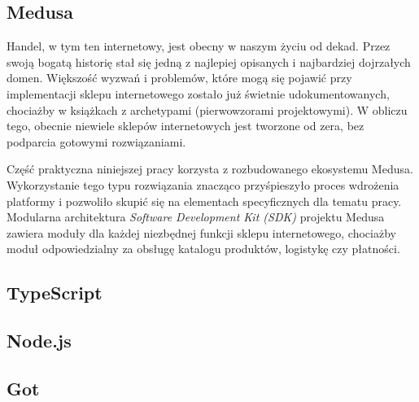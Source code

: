 %

%
%
%

\subsection{Medusa}\label{subsec:medusa}

Handel, w tym ten internetowy, jest obecny w naszym życiu od dekad.
Przez swoją bogatą historię stał się jedną z najlepiej opisanych i najbardziej dojrzałych domen.
Większość wyzwań i problemów, które mogą się pojawić przy implementacji sklepu internetowego zostało już świetnie udokumentowanych, chociażby w książkach z archetypami (pierwowzorami projektowymi).
W obliczu tego, obecnie niewiele sklepów internetowych jest tworzone od zera, bez podparcia gotowymi rozwiązaniami.

Część praktyczna niniejszej pracy korzysta z rozbudowanego ekosystemu Medusa\cite{medusajs-home}.
Wykorzystanie tego typu rozwiązania znacząco przyśpieszyło proces wdrożenia platformy i pozwoliło skupić się na elementach specyficznych dla tematu pracy.
Modularna architektura \emph{Software Development Kit (SDK)} projektu Medusa zawiera moduły dla każdej niezbędnej funkcji sklepu internetowego, chociażby moduł odpowiedzialny za obsługę katalogu produktów, logistykę czy płatności.

\subsection{TypeScript}\label{subsec:typescript}


\subsection{Node.js}\label{subsec:nodejs}


\subsection{Got}\label{subsec:got}


